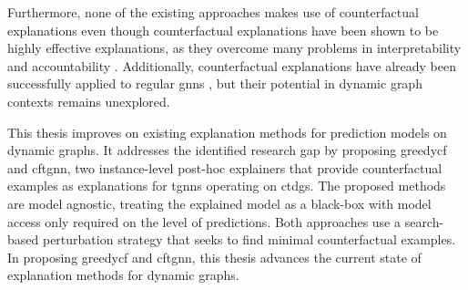 Furthermore, none of the existing approaches makes use of counterfactual explanations even though counterfactual explanations have been shown to be highly effective explanations, as they overcome many problems in interpretability and accountability \cite{wachter_counterfactual_2018}. Additionally, counterfactual explanations have already been successfully applied to regular \glspl{gnn} \cite{tan_learning_2022, lucic_cf-gnnexplainer_2022}, but their potential in dynamic graph contexts remains unexplored.

This thesis improves on existing explanation methods for prediction models on dynamic graphs. It addresses the identified research gap by proposing \gls{greedycf} and \gls{cftgnn}, two instance-level post-hoc explainers that provide counterfactual examples as explanations for \glspl{tgnn} operating on \glspl{ctdg}. The proposed methods are model agnostic, treating the explained model as a black-box with model access only required on the level of predictions. Both approaches use a search-based perturbation strategy that seeks to find minimal counterfactual examples. In proposing \gls{greedycf} and \gls{cftgnn}, this thesis advances the current state of explanation methods for dynamic graphs.


